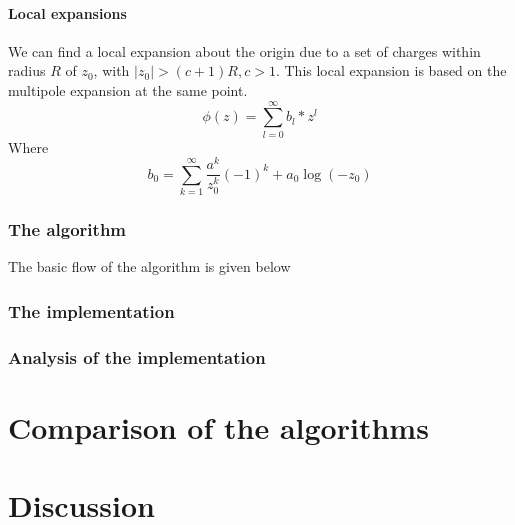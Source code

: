 \documentclass[pdftex,twoside,a4paper]{report}
\newcommand{\hs}{$\hspace{0.5cm}$}
\begin{document}
\subsubsection{Local expansions}
We can find a local expansion about the origin due to a set of charges within radius $R$ of $z_0$, with $|z_0| > (c+1)R, \hs c > 1$. This local expansion is based on the multipole expansion at the same point.
\begin{equation}
\phi(z) = \sum _{l=0} ^{\infty} b_l * z^l
\label{local_expansion}
\end{equation}
Where
\begin{equation}
b_0 = \sum_{k=1} ^{\infty} \frac{a^k}{z^k_0} (-1)^k + a_0 \log(-z_0)
\label{where_local_expansion}
\end{equation}


\subsection{The algorithm}
The basic flow of the algorithm is given below\\
\begin{algorithm}[H]
\SetLine
{}

\end{algorithm}

\subsection{The implementation}
\subsection{Analysis of the implementation}

\chapter{Comparison of the algorithms}
\label{chap:compare}
\chapter{Discussion}

	
	
\end{document}
